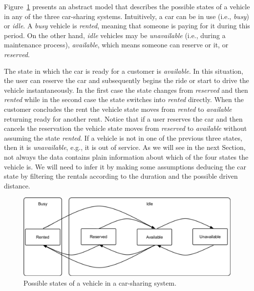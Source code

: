 Figure~\ref{fig:4_2_diagrama} presents an abstract model that describes the possible states of a vehicle in any of the three car-sharing systems.
Intuitively, a car can be in use (i.e., \textit{busy}) or \textit{idle}. A \textit{busy} vehicle is \textit{rented}, meaning that someone is paying for it during this period. On the other hand, \textit{idle} vehicles may be \textit{unavailable} (i.e., during a maintenance process), \textit{available}, which means someone can reserve or it, or \textit{reserved}. 

The state in which the car is ready for a customer is \textit{available}. In this situation, the user can reserve the car and subsequently begins the ride or start to drive the vehicle instantaneously. In the first case the state changes from \textit{reserved} and then \textit{rented} while in the second case the state switches into \textit{rented} directly. When the customer concludes the rent the vehicle state moves from \textit{rented} to \textit{available} returning ready for another rent. Notice that if a user reserves the car and then cancels the reservation the vehicle state moves from \textit{reserved} to \textit{available} without assuming the state \textit{rented}. If a vehicle is not in one of the previous three states, then it is \textit{unavailable}, e.g., it is out of service. As we will see in the next Section, not always the data contains plain information about which of the four states the vehicle is. We will need to infer it by making some assumptions deducing the car state by filtering the rentals according to the duration and the possible driven distance.

\begin{figure}[tbh]
\centering
\includegraphics[width=1\textwidth]{imagens/diagrama_v4.pdf}
\caption{Possible states of a vehicle in a car-sharing system.}
\label{fig:4_2_diagrama}
\end{figure}